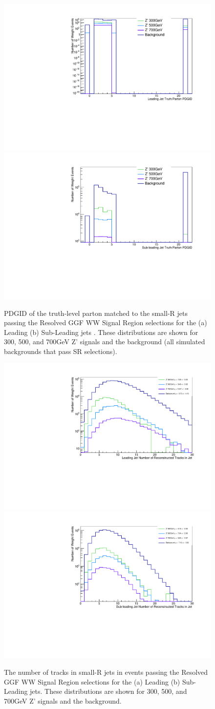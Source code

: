 \begin{figure}[h!]
  \centering
  \includegraphics[width=0.45\hsize]{figures/QGT/sigWJ1_pdgid_Pass_Res_GGF_WW_SR.pdf}
 \includegraphics[width=0.45\hsize]{figures/QGT/sigWJ2_pdgid_Pass_Res_GGF_WW_SR.pdf}
  \caption{PDGID of the truth-level parton matched to the small-R jets passing the Resolved GGF WW Signal Region selections for the (a) Leading (b) Sub-Leading jets . These distributions are shown for 300, 500, and 700GeV Z' signals and the background (all simulated backgrounds that pass SR selections).}
  \label{fig:diag_pdgid}
\end{figure}
\FloatBarrier



\begin{figure}[h!]
  \centering
  \includegraphics[width=0.45\hsize]{figures/QGT/sigWJ1_nTrk_Pass_Res_GGF_WW_SR.pdf}
 \includegraphics[width=0.45\hsize]{figures/QGT/sigWJ2_nTrk_Pass_Res_GGF_WW_SR.pdf}
  \caption{The number of tracks in small-R jets in events passing the Resolved GGF WW Signal Region selections for the (a) Leading (b) Sub-Leading jets. These distributions are shown for 300, 500, and 700GeV Z' signals and the background.}
  \label{fig:diag_ntrk}
\end{figure}
\FloatBarrier


